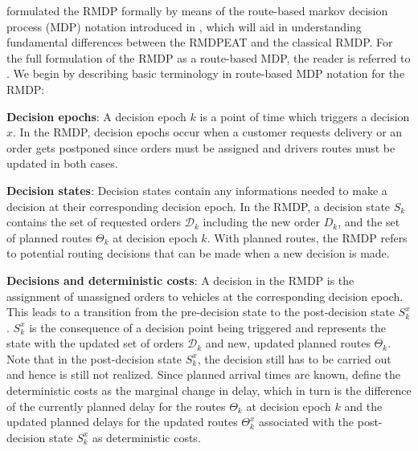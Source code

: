 \cite{UlmerRMDP} formulated the RMDP formally by means of the route-based markov decision process (MDP) notation introduced in \cite{ulmer2017route}, which will aid in understanding fundamental differences between the RMDPEAT and the classical RMDP. For the full formulation of the RMDP as a route-based MDP, the reader is referred to \cite{UlmerRMDP}. We begin by describing basic terminology in route-based MDP notation for the RMDP:
\begin{description}[font=$\bullet$\scshape\bfseries]
	\item \textbf{Decision epochs}: A decision epoch $ k $ is a point of time which triggers a decision $ x $. In the RMDP, decision epochs occur when a customer requests delivery or an order gets postponed since orders must be assigned and drivers routes must be updated in both cases.
	
	\item \textbf{Decision states}: Decision states contain any informations needed to make a decision at their corresponding decision epoch. In the RMDP, a decision state $ S_k $ contains the set of requested orders $ \mathcal{D}_k $ including the new order $ D_k $, and the set of planned routes $ \Theta_k $ at decision epoch $ k $. With planned routes, the RMDP refers to potential routing decisions that can be made when a new decision is made. 
	
	\item \textbf{Decisions and deterministic costs}: A decision in the RMDP is the assignment of unassigned orders to vehicles at the corresponding decision epoch. This leads to a transition from the pre-decision state to the post-decision state $ S^{x}_k $. $ S^{x}_k $ is the consequence of a decision point being triggered and represents the state with the updated set of orders $ \mathcal{D}_k $ and new, updated planned routes $ \Theta_k $. Note that in the post-decision state $ S^{x}_k $, the decision still has to be carried out and hence is still not realized. Since planned arrival times are known, \cite{UlmerRMDP} define the deterministic costs as the marginal change in delay, which in turn is the difference of the currently planned delay for the routes $ \Theta_k $ at decision epoch $ k $ and the updated planned delays for the updated routes $ \Theta^{x}_k $ associated with the post-decision state $ S^{x}_k $ as deterministic costs.
	

\end{description}
